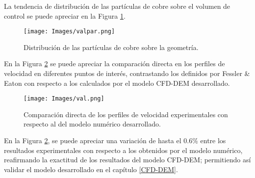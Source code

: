 \noindent
\justify

La tendencia de distribuci\'on de las part\'iculas de cobre sobre el volumen de control se puede apreciar en la Figura \ref{valten}.

\begin{figure}[h!]
	\centering
	\texttt{[image: Images/valpar.png]}
	\caption{Distribuci\'on de las part\'iculas de cobre sobre la geometr\'ia.}
	\label{valten}
\end{figure}

\noindent
\justify

En la Figura \ref{valcompa} se puede apreciar la comparaci\'on directa en los perfiles de velocidad en diferentes puntos de inter\'es, contrastando los definidos por Fessler \& Eaton con respecto a los calculados por el modelo CFD-DEM desarrollado.

\begin{figure}[h!]
	\centering
	\texttt{[image: Images/val.png]}
	\caption{Comparaci\'on directa de los perfiles de velocidad experimentales con respecto al del modelo num\'erico desarrollado.}
	\label{valcompa}
\end{figure}

\noindent
\justify

En la Figura \ref{valcompa}, se puede apreciar una variaci\'on de hasta el $0.6\%$  entre los resultados experimentales con respecto a los obtenidos por el modelo num\'erico, reafirmando la exactitud de los resultados del modelo CFD-DEM; permitiendo as\'i validar el modelo desarrollado en el cap\'itulo \ref{CFD-DEM}.
